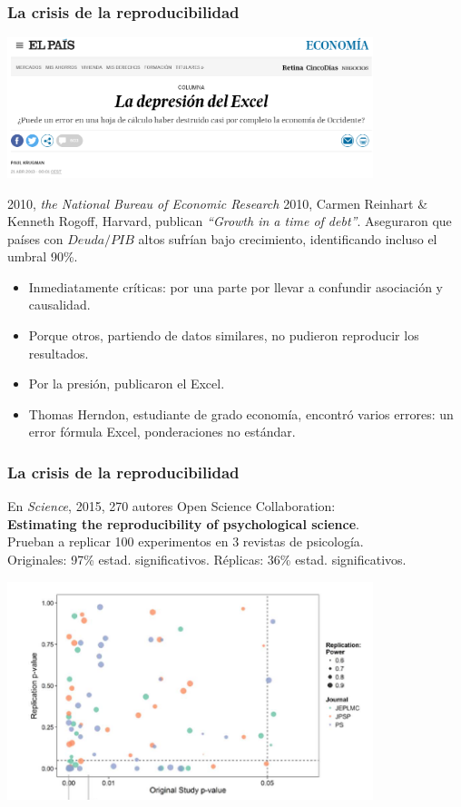 \documentclass[9pt]{beamer}
\begin{document}
\begin{frame}
  \frametitle{La crisis de la reproducibilidad}
  
  \begin{center}
    \includegraphics[width=0.8\textwidth]{images/elpais_krugman}
  \end{center}
  \begin{block}{2010, \textit{the National Bureau of Economic Research}}
  2010, Carmen Reinhart \& Kenneth Rogoff, Harvard, publican \textit{``Growth in a time
    of debt''}.
   Aseguraron que países con $Deuda / PIB$ altos sufrían
  bajo crecimiento, identificando incluso el umbral 90\%.
\end{block}
\begin{itemize}
  \scriptsize
  \item<4-> Inmediatamente críticas: por una parte por llevar a
    confundir asociación y causalidad. 
  \item<5-> Porque otros, partiendo de datos similares, no pudieron reproducir
    los resultados.
  \item<6-> Por la presión, publicaron el Excel.
  \item<7->  Thomas Herndon, estudiante de grado economía, encontró
    varios errores: un error fórmula Excel, ponderaciones no estándar.
  \end{itemize}
\end{frame}


\begin{frame}
  \frametitle{La crisis de la reproducibilidad}
  En \textit{Science}, 2015, 270 autores  Open Science
  Collaboration:\\ 
  \textbf{Estimating the reproducibility of psychological science}.\\
  Prueban a replicar 100 experimentos en 3 revistas de psicología. \\
   Originales: 97\% estad.
  significativos. Réplicas: 36\% estad. significativos.
  \begin{center}
    \includegraphics[width=0.8\textwidth]{images/original_vs_replicated_p-value}
  \end{center}
\end{frame}
\end{document}
